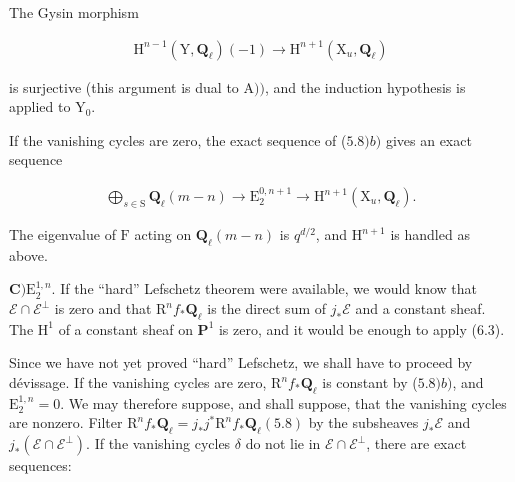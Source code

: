 \documentclass[10pt,leqno]{article}
\begin{document}
\begingroup\setlength{\parskip}{.20em}\setlength{\abovedisplayskip}{4pt}\setlength{\belowdisplayskip}{4pt}\setlength{\abovedisplayshortskip}{2pt}\setlength{\belowdisplayshortskip}{2pt}

\label{physical-29}\par\smallskip

\noindent The Gysin morphism\par

\begin{equation*}\begin{gathered}\mathrm{H}^{n- 1}(\mathrm{Y},\mathbf{Q}_{\ell })(- 1) \longrightarrow  \mathrm{H}^{n+1}(\mathrm{X}_{u},\mathbf{Q}_{\ell })\end{gathered}\end{equation*}

\noindent is surjective (this argument is dual to \(\mathrm{A}))\), and the induction hypothesis is applied to \(\mathrm{Y}_{0}\).\par

\noindent If the vanishing cycles are zero, the exact sequence of (\(5.8) b)\) gives an exact sequence\par

\begin{equation*}\begin{gathered}\bigoplus\limits_{s\in \mathrm{S}} \mathbf{Q}_{\ell }(m- n) \longrightarrow  \mathrm{E}_{2}^{0,n+1} \longrightarrow  \mathrm{H}^{n+1}(\mathrm{X}_{u},\mathbf{Q}_{\ell }).\end{gathered}\end{equation*}

\noindent The eigenvalue of \(\mathrm{F}\) acting on \(\mathbf{Q}_{\ell }(m- n)\) is \(q^{d/2}\), and \(\mathrm{H}^{n+1}\) is handled as above.\par

\noindent \(\mathbf{C}) \mathrm{E}_{2}^{1,n}\). If the “hard” Lefschetz theorem were available, we would know that \(\mathcal{E} \cap \mathcal{E} ^{\perp }\) is zero and that \(\mathrm{R}^{n} f_{*}\mathbf{Q}_{\ell }\) is the direct sum of \(j_{*}\mathcal{E} \) and a constant sheaf. The \(\mathrm{H}^{1}\) of a constant sheaf on \(\mathbf{P}^{1}\) is zero, and it would be enough to apply (6.3).\par

\noindent Since we have not yet proved “hard” Lefschetz, we shall have to proceed by dévissage. If the vanishing cycles are zero, \(\mathrm{R}^{n} f_{*}\mathbf{Q}_{\ell }\) is constant by (\(5.8) b)\), and \(\mathrm{E}_{2}^{1,n}=0\). We may therefore suppose, and shall suppose, that the vanishing cycles are nonzero. Filter \(\mathrm{R}^{n} f_{*}\mathbf{Q}_{\ell }=j_{*}j^{*}\mathrm{R}^{n} f_{*}\mathbf{Q}_{\ell } (5.8)\) by the subsheaves \(j_{*}\mathcal{E} \) and \(j_{*}(\mathcal{E} \cap \mathcal{E} ^{\perp })\). If the vanishing cycles \(\delta \) do not lie in \(\mathcal{E} \cap \mathcal{E} ^{\perp }\), there are exact sequences:\par
\end{document}
